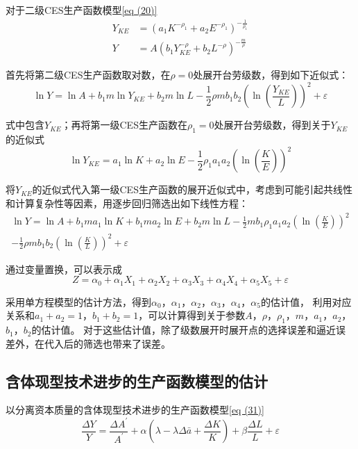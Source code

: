 	对于二级CES生产函数模型\eqref{eq (20)}
	\begin{align*}
		Y_{K E} & = \left(a_{1} K^{-\rho_{1}}+a_{2} E^{-\rho_{1}}\right)^{-\frac{1}{\rho_{1}}} \nonumber \\
			Y & = A\left(b_{1} Y_{K E}^{-\rho}+b_{2} L^{-\rho}\right)^{-\frac{m}{\rho}}
	\end{align*}
		
	首先将第二级CES生产函数取对数，在$ \rho = 0 $处展开台劳级数，得到如下近似式：
	$$ \ln Y=\ln A+b_{1} m \ln Y_{K E}+b_{2} m \ln L-\frac{1}{2} \rho m b_{1} b_{2}\left(\ln \left(\frac{Y_{K E}}{L}\right)\right)^{2}+\varepsilon $$

	式中包含$ Y_{KE} $；再将第一级CES生产函数在$ \rho_{1} = 0 $处展开台劳级数，得到关于$ Y_{KE} $的近似式
	$$ \ln Y_{K E}=a_{1} \ln K+a_{2} \ln E-\frac{1}{2} \rho_{1} a_{1} a_{2}\left(\ln \left(\frac{K}{E}\right)\right)^{2} $$

	将$ Y_{KE} $的近似式代入第一级CES生产函数的展开近似式中，考虑到可能引起共线性和计算复杂性等因素，用逐步回归筛选出如下线性方程：
	\begin{gather}
		\ln Y=\ln A+b_{1} m a_{1} \ln K+b_{1} m a_{2} \ln E+b_{2} m \ln L
			-\frac{1}{2} m b_{1} \rho_{1} a_{1} a_{2}\left(\ln \left(\frac{K}{E}\right)\right)^{2} \nonumber \\
		-\frac{1}{2} \rho m b_{1} b_{2}\left(\ln \left(\frac{K}{L}\right)\right)^{2}+\varepsilon 
		\label{eq (40)}
	\end{gather}

	通过变量置换，可以表示成
	$$ Z=\alpha_{0}+\alpha_{1} X_{1}+\alpha_{2} X_{2}+\alpha_{3} X_{3}+\alpha_{4} X_{4}+\alpha_{5} X_{5}+\varepsilon $$

	采用单方程模型的估计方法，得到$ \alpha_{0} $，$ \alpha_{1} $，$ \alpha_{2} $，$ \alpha_{3} $，$ \alpha_{4} $，$ \alpha_{5} $的估计值，
	利用对应关系和$ a_{1}+a_{2}=1 $，$ b_{1}+b_{2}=1 $，可以计算得到关于参数$ A $，$ \rho $，$ \rho_{1} $，$ m $，$ a_{1} $，$ a_{2} $，$ b_{1} $，$ b_{2} $的估计值。
	对于这些估计值，除了级数展开时展开点的选择误差和逼近误差外，在代入后的筛选也带来了误差。
		
{\subsection{含体现型技术进步的生产函数模型的估计}  }
		
	以分离资本质量的含体现型技术进步的生产函数模型\eqref{eq (31)}
	$$ \frac{\Delta Y}{Y}=\frac{\Delta A^{\prime}}{A^{\prime}}+\alpha
	\left(\lambda-\lambda \Delta \bar{a}+\frac{\Delta K}{K}\right)+\beta \frac{\Delta L}{L}+\varepsilon $$
	
